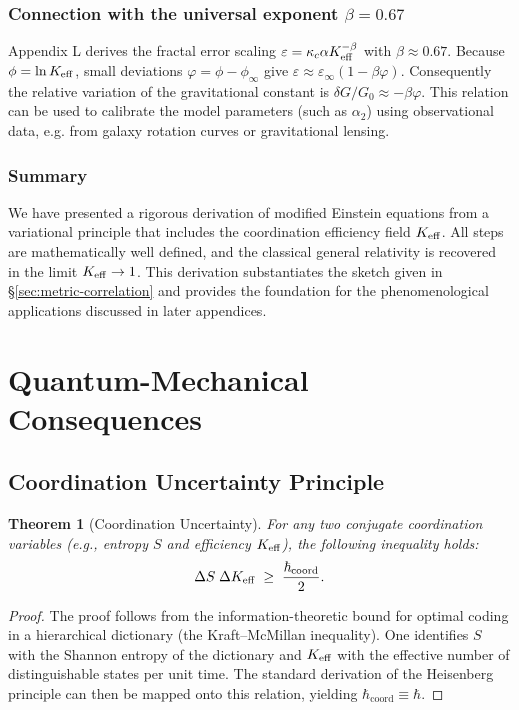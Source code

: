 \documentclass[12pt,a4paper]{article}
\newtheorem{theorem}{Theorem}[section]
\newcommand{\Keff}[1][]{K_{\mathrm{eff}\if\relax\detokenize{#1}\relax\else,#1\fi}}   %
\newcommand{\hcoord}{\hbar_{\mathrm{coord}}}
\begin{document}
	\subsubsection{Connection with the universal exponent \(\beta = 0.67\)}
	Appendix L derives the fractal error scaling \(\varepsilon = \kappa_c \alpha \Keff^{-\beta}\) with \(\beta\approx0.67\). Because \(\phi = \ln\Keff\), small deviations $\varphi = \phi-\phi_\infty$ give $\varepsilon \approx \varepsilon_\infty(1-\beta\varphi)$. Consequently the relative variation of the gravitational constant is $\delta G/G_0 \approx -\beta\varphi$. This relation can be used to calibrate the model parameters (such as $\alpha_2$) using observational data, e.g. from galaxy rotation curves or gravitational lensing.
	
	\subsubsection{Summary}
	We have presented a rigorous derivation of modified Einstein equations from a variational principle that includes the coordination efficiency field $\Keff$. All steps are mathematically well defined, and the classical general relativity is recovered in the limit $\Keff\to1$. This derivation substantiates the sketch given in \S\ref{sec:metric-correlation} and provides the foundation for the phenomenological applications discussed in later appendices.
	
	\section{Quantum-Mechanical Consequences}
	
	\subsection{Coordination Uncertainty Principle}
	
	\begin{theorem}[Coordination Uncertainty]
		For any two conjugate coordination variables (e.g., entropy $S$ and efficiency $\Keff$), the following inequality holds:
		\begin{equation}
			\Delta S \; \Delta \Keff \;\ge\; \frac{\hcoord}{2}.
			\label{eq:uncertainty}
		\end{equation}
	\end{theorem}
	
	\begin{proof}
		The proof follows from the information-theoretic bound for optimal coding in a hierarchical dictionary (the Kraft–McMillan inequality). One identifies $S$ with the Shannon entropy of the dictionary and $\Keff$ with the effective number of distinguishable states per unit time. The standard derivation of the Heisenberg principle can then be mapped onto this relation, yielding $\hcoord \equiv \hbar$.
	\end{proof}
	
\end{document}
